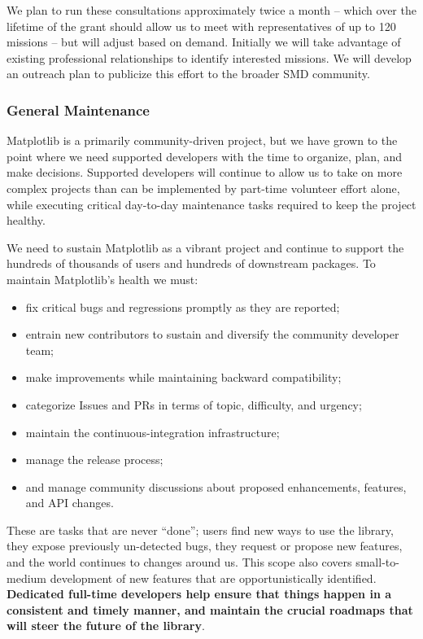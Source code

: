 \documentclass[12pt]{article}
\numberwithin{page}{section}
\begin{document}
We plan to run these consultations approximately twice a month -- which over
the lifetime of the grant should allow us to meet with representatives of up to
120 missions -- but will adjust based on demand.  Initially we will
take advantage of existing professional relationships to identify interested
missions.  We will develop an outreach plan to publicize
this effort to the broader SMD community.



\subsubsection{General Maintenance}

Matplotlib is a primarily community-driven project, but we have grown to the
point where we need supported developers with the time to organize, plan, and
make decisions.  Supported developers will continue to allow us to take on more
complex projects than can be implemented by part-time volunteer effort alone,
while executing critical day-to-day maintenance tasks required to keep the
project healthy.


We need to sustain Matplotlib as a vibrant project and continue to support the
hundreds of thousands of users and hundreds of downstream packages.  To maintain
Matplotlib's health we must:
\begin{itemize}[noitemsep]
\item fix critical bugs and regressions promptly as they are reported;
\item entrain new contributors to sustain and diversify the community
  developer team;
\item make improvements while maintaining backward compatibility;
\item categorize Issues and PRs in terms of topic, difficulty, and
  urgency;
\item maintain the continuous-integration infrastructure;
\item manage the release process;
\item and manage community discussions about proposed enhancements, features,
  and API changes.
\end{itemize}
These are tasks that are never ``done''; users find new ways to use the
library, they expose previously un-detected bugs, they request or propose new
features, and the world continues to changes around us.  This scope also covers
small-to-medium development of new features that are opportunistically
identified.  \textbf{Dedicated full-time developers help ensure that things
  happen in a consistent and timely manner, and maintain the crucial roadmaps
  that will steer the future of the library}.
\end{document}
